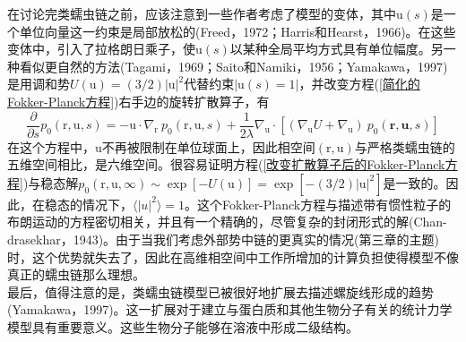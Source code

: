 在讨论完类蠕虫链之前，应该注意到一些作者考虑了模型的变体，其中$\mathrm{u}(s)$是一个单位向量这一约束是局部放松的(Freed，1972；Harris和Hearst，1966)。在这些变体中，引入了拉格朗日乘子，使$\mathrm{u}(s)$以某种全局平均方式具有单位幅度。另一种看似更自然的方法(Tagami，1969；Saito和Namiki，1956；Yamakawa，1997)是用调和势$U(\mathrm{u})=(3/2)|\mathrm{u}|^2$代替约束$|\mathrm{u}(s)=1|$，并改变方程(\ref{简化的Fokker-Planck方程})右手边的旋转扩散算子，有\\
\begin{equation}
	\frac{\partial}{\partial s}p_0(\mathrm{r},\mathrm{u},s)=-\mathrm{u}\cdot \nabla_\mathrm{r} \ p_0(\mathrm{r},\mathrm{u},s)+\frac{1}{2\lambda}\nabla_\mathrm{u}\cdot [(\nabla_\mathrm{u}U+\nabla_\mathrm{u})\ p_0(\mathbf{r},\mathbf{u},s)]\label{改变扩散算子后的Fokker-Planck方程}
\end{equation}
在这个方程中，$\mathrm{u}$不再被限制在单位球面上，因此相空间$(\mathrm{r},\mathrm{u})$与严格类蠕虫链的五维空间相比，是六维空间。很容易证明方程(\ref{改变扩散算子后的Fokker-Planck方程})与稳态解$p_0(\mathrm{r},\mathrm{u},\infty)\sim \exp[−U(\mathrm{u})]=\exp[−(3/2)|\mathrm{u}|^2]$是一致的。因此，在稳态的情况下，$\langle |u|^2\rangle=1$。这个Fokker-Planck方程与描述带有惯性粒子的布朗运动的方程密切相关，并且有一个精确的，尽管复杂的封闭形式的解(Chan-drasekhar，1943)。由于当我们考虑外部势中链的更真实的情况(第三章的主题)时，这个优势就失去了，因此在高维相空间中工作所增加的计算负担使得模型不像真正的蠕虫链那么理想。\\

最后，值得注意的是，类蠕虫链模型已被很好地扩展去描述螺旋线形成的趋势(Yamakawa，1997)。这一扩展对于建立与蛋白质和其他生物分子有关的统计力学模型具有重要意义。这些生物分子能够在溶液中形成二级结构。\\
\endinput
